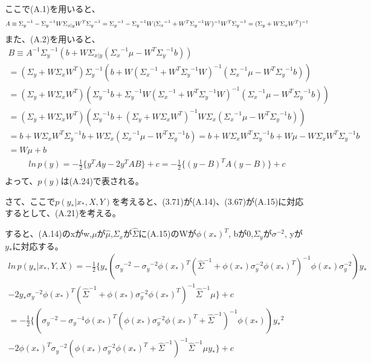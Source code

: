 \documentclass{jsarticle}
\begin{document}
ここで(A.1)を用いると、
\begin{equation}
A \equiv {\Sigma_y}^{-1} - {\Sigma_y}^{-1}W\Sigma_{x|y} W^T{\Sigma_y}^{-1} = {\Sigma_y}^{-1} - {\Sigma_y}^{-1}W ({\Sigma_x}^{-1} + W^T {\Sigma_y}^{-1}W)^{-1} W^T{\Sigma_y}^{-1}\\
= (\Sigma_y + W \Sigma_x W^T)^{-1}
\end{equation}
また、(A.2)を用いると、
\begin{equation}
\begin{split}
B \equiv A^{-1}{\Sigma_y}^{-1} (b + W{\Sigma_{x|y}}({\Sigma_x}^{-1}\mu - W^T{\Sigma_y}^{-1}b))\\
=(\Sigma_y + W \Sigma_x W^T){\Sigma_y}^{-1} (b + W({\Sigma_x}^{-1} + W^T {\Sigma_y}^{-1}W)^{-1}({\Sigma_x}^{-1}\mu - W^T{\Sigma_y}^{-1}b))\\
=(\Sigma_y + W \Sigma_x W^T) ({\Sigma_y}^{-1}b + {\Sigma_y}^{-1}W({\Sigma_x}^{-1} + W^T {\Sigma_y}^{-1}W)^{-1}({\Sigma_x}^{-1}\mu - W^T{\Sigma_y}^{-1}b))\\
=(\Sigma_y + W \Sigma_x W^T) ({\Sigma_y}^{-1}b + (\Sigma_y + W \Sigma_x W^T)^{-1} W \Sigma_x ({\Sigma_x}^{-1}\mu - W^T{\Sigma_y}^{-1}b))\\
=b + W \Sigma_x W^T {\Sigma_y}^{-1}b + W \Sigma_x ({\Sigma_x}^{-1}\mu - W^T{\Sigma_y}^{-1}b)
=b + W \Sigma_x W^T {\Sigma_y}^{-1}b + W \mu - W \Sigma_x W^T{\Sigma_y}^{-1}b\\
=W \mu + b
\end{split}
\end{equation}
\begin{equation}
\begin{split}
ln \, p(y) = -\frac{1}{2} \{ y^T A y - 2 y^T AB \} + c = -\frac{1}{2} \{ (y - B)^T A (y - B) \} + c \\
\end{split}
\end{equation}
よって、$p(y)$は(A.24)で表される。

さて、ここで$p(y_*| x_*, X, Y)$を考えると、(3.71)が(A.14)、(3.67)が(A.15)に対応するとして、(A.21)を考える。

すると、(A.14)のxがw,$\mu$が$\hat{\mu}$,$\Sigma_x$が$\hat{\Sigma}$に(A.15)のWが$\phi(x_*)^T$, bが0,$\Sigma_y$が$\sigma^{-2}$, yが$y_*$に対応する。
\begin{equation}
\begin{split}
ln \, p(y_* | x_*, Y, X) = -\frac{1}{2} \{ y_* ({\sigma_y}^{-2} - {\sigma_y}^{-2} \phi(x_*)^T (\hat{\Sigma}^{-1} + \phi(x_*)\sigma_y^{-2} \phi(x_*)^T)^{-1}\phi(x_*)\sigma_y^{-2}) y_* \\
-2 y_* {\sigma_y}^{-2} \phi(x_*)^T (\hat{\Sigma}^{-1} + \phi(x_*)\sigma_y^{-2} \phi(x_*)^T)^{-1} \hat{\Sigma}^{-1}\mu \} + c\\
= -\frac{1}{2} \{ ({\sigma_y}^{-2} - {\sigma_y}^{-4} \phi(x_*)^T (\phi(x_*)\sigma_y^{-2} \phi(x_*)^T + \hat{\Sigma}^{-1})^{-1}\phi(x_*)) {y_*}^{2} \\
-2 \phi(x_*)^T {\sigma_y}^{-2} (\phi(x_*)\sigma_y^{-2} \phi(x_*)^T + \hat{\Sigma}^{-1})^{-1} \hat{\Sigma}^{-1}\mu y_* \} + c
\end{split}
\end{equation}
\end{document}
